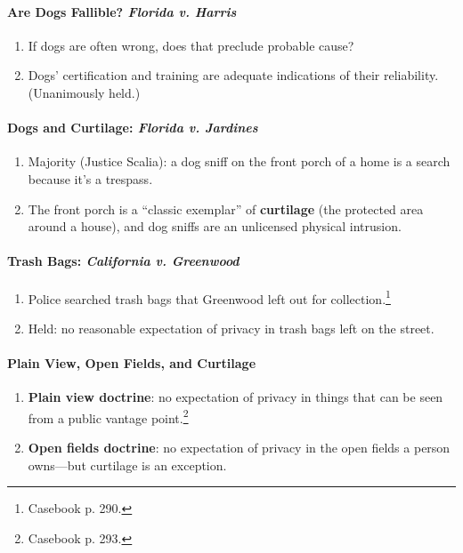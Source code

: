 \paragraph{Are Dogs Fallible? \emph{Florida v. Harris}}

\begin{enumerate}
    \item If dogs are often wrong, does that preclude probable cause?
    \item Dogs' certification and training are adequate indications of their 
    reliability. (Unanimously held.)
\end{enumerate}

\paragraph{Dogs and Curtilage: \emph{Florida v. Jardines}}

\begin{enumerate}
    \item Majority (Justice Scalia): a dog sniff on the front porch of a home 
    is a search because it's a trespass.
    \item The front porch is a ``classic exemplar'' of \textbf{curtilage} (the 
    protected area around a house), and dog sniffs are an unlicensed physical 
    intrusion.
\end{enumerate}

\paragraph{Trash Bags: \emph{California v. Greenwood}}

\begin{enumerate}
    \item Police searched trash bags that Greenwood left out for 
    collection.\footnote{Casebook p. 290.}
    \item Held: no reasonable expectation of privacy in trash bags left on the 
    street.
\end{enumerate}

\paragraph{Plain View, Open Fields, and Curtilage}

\begin{enumerate}
    \item \textbf{Plain view doctrine}: no expectation of privacy in things 
    that can be seen from a public vantage point.\footnote{Casebook p. 293.}
    \item \textbf{Open fields doctrine}: no expectation of privacy in the open 
    fields a person owns---but curtilage is an exception.
\end{enumerate}

